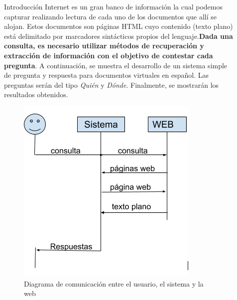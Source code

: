 \documentclass[final]{beamer}
\newlength{\sepwid}
\newlength{\onecolwid}
\newlength{\twocolwid}
\begin{document}
\begin{frame}[t]
\begin{columns}[t]
\begin{column}{\onecolwid}
\begin{block}{Introducción}
Internet es un gran banco de información la cual podemos capturar realizando lectura de cada uno de los documentos que allí se alojan. Estos documentos son páginas HTML cuyo contenido (texto plano) está delimitado por marcadores sintácticos propios del lenguaje.\textbf{Dada una consulta, es necesario utilizar métodos de recuperación y extracción de información con el objetivo de contestar cada pregunta}. A continuación, se muestra el desarrollo de un sistema simple de pregunta y respuesta para documentos virtuales en español. Las preguntas serán del tipo \textit{Quién} y \textit{Dónde}. Finalmente, se mostrarán los resultados obtenidos.\\
\begin{figure}
\centering
\includegraphics[scale=1.7]{img/diagrama.png} 
\caption{Diagrama de comunicación entre el usuario, el sistema y la web}
\end{figure}
\end{block}



\end{column} %

\begin{column}{\sepwid}\end{column} %

\begin{column}{\twocolwid} %

\begin{columns}[t,totalwidth=\twocolwid] %


\end{columns}
\end{column}
\end{columns}
\end{frame}
\end{document}
